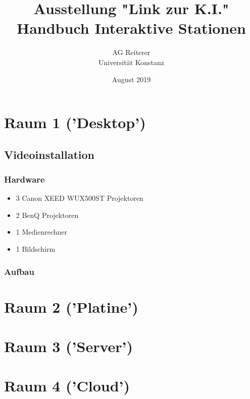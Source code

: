 \documentclass[titlepage,a4paper]{article}
\title{Ausstellung "Link zur K.I."\\
Handbuch Interaktive Stationen}
\author{
    AG Reiterer\\
    Universität Konstanz
}
\date{August 2019}
\begin{document}
\begin{titlepage}
\maketitle
\end{titlepage}



\tableofcontents

\pagebreak

\listoffigures 

\pagebreak


\section{Raum 1 ('Desktop')}

\subsection{Videoinstallation}

\subsubsection{Hardware}

\begin{itemize}
\item 3 Canon XEED WUX500ST Projektoren
\item 2 BenQ Projektoren
\item 1 Medienrechner
\item 1 Bildschirm
\end{itemize}

\subsubsection{Aufbau}

\section{Raum 2 ('Platine')}

\section{Raum 3 ('Server')}

\section{Raum 4 ('Cloud')}
\end{document}

